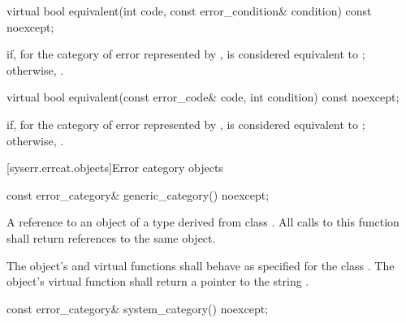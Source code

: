 \begin{itemdecl}
virtual bool equivalent(int code, const error_condition& condition) const noexcept;
\end{itemdecl}

\begin{itemdescr}
\pnum
\returns {} if, for the category of error represented by ,  is considered equivalent to ; otherwise, .
\end{itemdescr}

\begin{itemdecl}
virtual bool equivalent(const error_code& code, int condition) const noexcept;
\end{itemdecl}

\begin{itemdescr}
\pnum
\returns {} if, for the category of error represented by ,  is considered equivalent to ; otherwise, .
\end{itemdescr}

[syserr.errcat.objects]{Error category objects}

\begin{itemdecl}
const error_category& generic_category() noexcept;
\end{itemdecl}

\begin{itemdescr}
\pnum
\returns A reference to an object of a type derived from class .
All calls to this function shall return references to the same object.

\pnum
\remarks The object's  and  virtual functions shall behave as specified for the class . The object's  virtual function shall return a pointer to the string .
\end{itemdescr}

\begin{itemdecl}
const error_category& system_category() noexcept;
\end{itemdecl}

